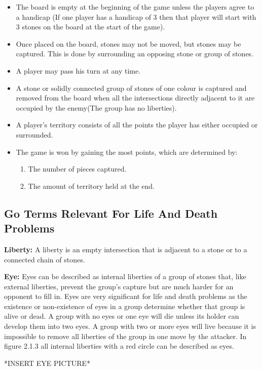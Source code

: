 \documentclass{l3proj}
\begin{document}
\begin{itemize}
\item The board is empty at the beginning of the game unless the players agree to a handicap (If one player has a handicap of 3 then that player will start with 3 stones on the board at the start of the game).
\item Once placed on the board, stones may not be moved, but stones may be captured. This is done by surrounding an opposing stone or group of stones. 
\item A player may pass his turn at any time.
\item A stone or solidly connected group of stones of one colour is captured and removed from the board when all the intersections directly adjacent to it are occupied by the enemy(The group has no liberties).
\item A player's territory consists of all the points the player has either occupied or surrounded.
\item  The game is won by gaining the most points, which are determined by:
\begin{enumerate}
\item The number of pieces captured.
\item The amount of territory held at the end.
\end{enumerate}
\end{itemize}

\subsection{Go Terms Relevant For Life And Death Problems}

\textbf{Liberty:} A liberty is an empty intersection that is adjacent to a stone or to a connected chain of stones.   

\textbf{Eye:} Eyes can be described as internal liberties of a group of stones that, like external liberties, prevent the group’s capture but are much harder for an opponent to fill in. Eyes are very significant for life and death problems as the existence or non-existence of eyes in a group determine whether that group is alive or dead. A group with no eyes or one eye will die unless its holder can develop them into two eyes. A group with two or more eyes will live because it is impossible to remove all liberties of the group in one move by the attacker. In figure 2.1.3 all internal liberties with a red circle can be described as eyes.

*INSERT EYE PICTURE*
\end{document}
